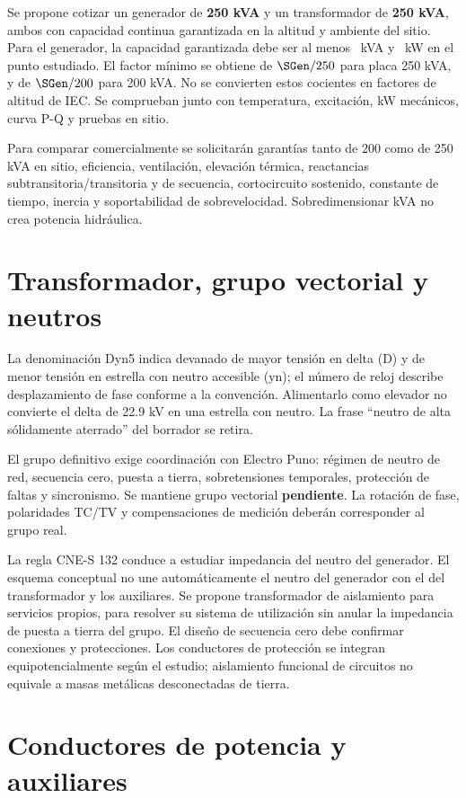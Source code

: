 Se propone cotizar un generador de \textbf{250 kVA} y un transformador de \textbf{250 kVA}, ambos con capacidad continua garantizada en la altitud y ambiente del sitio. Para el generador, la capacidad garantizada debe ser al menos \SGen\ kVA y \PeAlt\ kW en el punto estudiado. El factor mínimo se obtiene de $\SGen/250$ para placa 250 kVA, y de $\SGen/200$ para 200 kVA. No se convierten estos cocientes en factores de altitud de IEC. Se comprueban junto con temperatura, excitación, kW mecánicos, curva P-Q y pruebas en sitio.

Para comparar comercialmente se solicitarán garantías tanto de 200 como de 250 kVA en sitio, eficiencia, ventilación, elevación térmica, reactancias subtransitoria/transitoria y de secuencia, cortocircuito sostenido, constante de tiempo, inercia y soportabilidad de sobrevelocidad. Sobredimensionar kVA no crea potencia hidráulica.

\section{Transformador, grupo vectorial y neutros}
La denominación Dyn5 indica devanado de mayor tensión en delta (D) y de menor tensión en estrella con neutro accesible (yn); el número de reloj describe desplazamiento de fase conforme a la convención. Alimentarlo como elevador no convierte el delta de 22.9 kV en una estrella con neutro. La frase ``neutro de alta sólidamente aterrado'' del borrador se retira.

El grupo definitivo exige coordinación con Electro Puno: régimen de neutro de red, secuencia cero, puesta a tierra, sobretensiones temporales, protección de faltas y sincronismo. Se mantiene grupo vectorial \textbf{pendiente}. La rotación de fase, polaridades TC/TV y compensaciones de medición deberán corresponder al grupo real.

La regla CNE-S 132 conduce a estudiar impedancia del neutro del generador. El esquema conceptual no une automáticamente el neutro del generador con el del transformador y los auxiliares. Se propone transformador de aislamiento para servicios propios, para resolver su sistema de utilización sin anular la impedancia de puesta a tierra del grupo. El diseño de secuencia cero debe confirmar conexiones y protecciones. Los conductores de protección se integran equipotencialmente según el estudio; aislamiento funcional de circuitos no equivale a masas metálicas desconectadas de tierra.

\section{Conductores de potencia y auxiliares}

